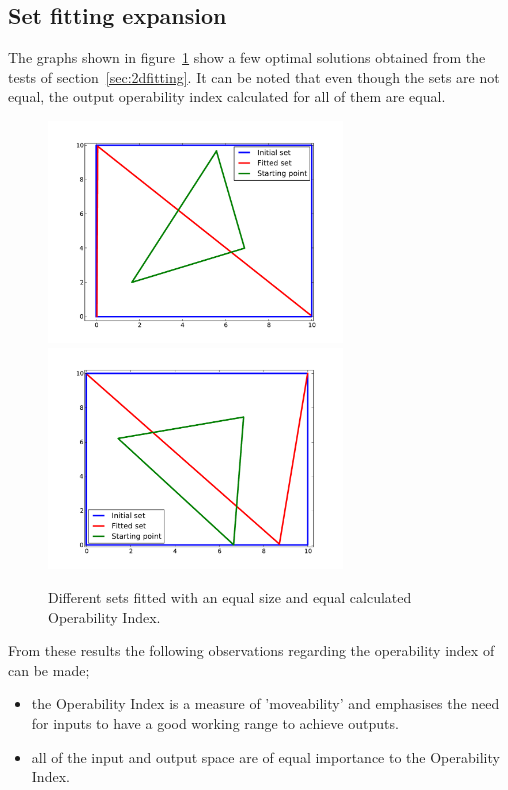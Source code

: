 \subsection{Set fitting expansion}\label{sec:setfitfuture}
The graphs shown in figure~\ref{fig:equaloifits} show a few optimal solutions obtained from the tests of section~\ref{sec:2dfitting}.
It can be noted that even though the sets are not equal, the output operability index \citep{vinsonphd} calculated for all of them are equal.
\begin{figure}[htbp]
  \centering
    \includegraphics[width=7.8cm]{graph/2dfit1.pdf}
    \includegraphics[width=7.8cm]{graph/2dfit2.pdf}
  \caption[Equal size constraint set fits]{Different sets fitted with an equal size and equal calculated Operability Index.}
  \label{fig:equaloifits}
\end{figure}

From these results the following observations regarding the operability index of \citet{vinsonphd} can be made;
\begin{itemize}
\item the Operability Index is a measure of 'moveability' and emphasises the need for inputs to have a good working range to achieve outputs.
\item all of the input and output space are of equal importance to the Operability Index.
\end{itemize}

